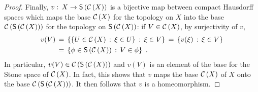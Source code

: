 \begin{proof}
	Finally, $v:\,X\rightarrow\mathsf{S}\left(\mathcal{C}\left(X\right)\right)$ is a bijective
 	map between compact Hausdorff spaces which maps the base
	$\mathcal{C}\left(X\right)$ for the topology on $X$ into the base
	$\mathcal{C}\left(\mathsf{S}\left(\mathcal{C}\left(X\right)\right)\right)$ for the topology on
	$\mathsf{S}\left(\mathcal{C}\left(X\right)\right)$: if $V\in\mathcal{C}\left(X\right)$, by surjectivity
	of $v$,
	\begin{align*}
		v(V) & \,=\,\left\lbrace
			\left\lbrace U\in\mathcal{C}\left(X\right)\,:\,\xi\in U
				\right\rbrace
				\,:\,\xi\in V\right\rbrace
			\,=\,\left\lbrace v(\xi)\,:\,\xi\in V
				\right\rbrace \\
		& \,=\, \left\lbrace\phi\in\mathsf{S}\left(\mathcal{C}\left(X\right)\right)
			\,:\,V\in\phi\right\rbrace
		\text{ .}
	\end{align*}
	In particular, $v(V)\in\mathcal{C}\left(\mathsf{S}\left(\mathcal{C}\left(X\right)\right)\right)$ and
	$v(V)$ is an element of the base for the Stone space of $\mathcal{C}\left(X\right)$.
	In fact, this shows that $v$ maps the base $\mathcal{C}\left(X\right)$ of $X$
	onto the base $\mathcal{C}\left(\mathsf{S}\left(\mathcal{C}\left(X\right)\right)\right)$. It then follows
	that $v$ is a homeomorphism.
\end{proof}

